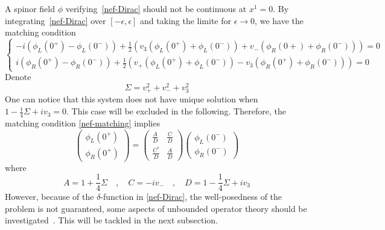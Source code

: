 A spinor field $\phi$ verifying~\cref{nef-Dirac} should not be continuous at $x^1 = 0$. 
By integrating~\cref{nef-Dirac} over $[-\epsilon, \epsilon]$ and taking the limite for $\epsilon \rightarrow 0$,
we have the matching condition
\begin{equation}\label{nef-matching}
\begin{cases}
-i(\phi_L(0^+) - \phi_L(0^-)) + \frac{1}{2}(v_3 (\phi_L(0^+) + \phi_L(0^-))+ v_- (\phi_R(0+) + \phi_R(0^-))) = 0 \\
i(\phi_R(0^+) - \phi_R(0^-)) + \frac{1}{2}(v_+ (\phi_L(0^+) + \phi_L(0^-)) - v_3 (\phi_R(0^+) + \phi_R(0^-))) = 0
\end{cases}
\end{equation}
Denote 
\begin{equation*}
\Sigma = v_+ ^ 2 + v_- ^ 2 + v_3 ^ 2
\end{equation*}
One can notice that this system does not have unique solution when $1 - \frac{1}{4}\Sigma + iv_3 = 0$. This case will be excluded in the following.
Therefore, the matching condition \cref{nef-matching} implies 
\begin{equation}\label{nef-matching2}
\begin{pmatrix}
\phi_L(0^+) \\
\phi_R(0^+)
\end{pmatrix} = \begin{pmatrix}
\frac{A}{D}  & \frac{C}{D} \\
\frac{C^*}{D} & \frac{A}{D}
\end{pmatrix}\begin{pmatrix}
\phi_L(0^-) \\
\phi_R(0^-)
\end{pmatrix}
\end{equation}
where 
\begin{equation*}
A = 1+ \frac{1}{4}\Sigma \quad, \quad
C = -iv_-  \quad, \quad
D = 1-\frac{1}{4}\Sigma + iv_3
\end{equation*}
%
%
However, because of the $\delta$-function in \cref{nef-Dirac}, 
the well-posedness of the problem is not guaranteed,
some aspects of unbounded operator theory should be investigated~\cite{Reed1981}.
This will be tackled in the next subsection.
%



%
%
%
%


















